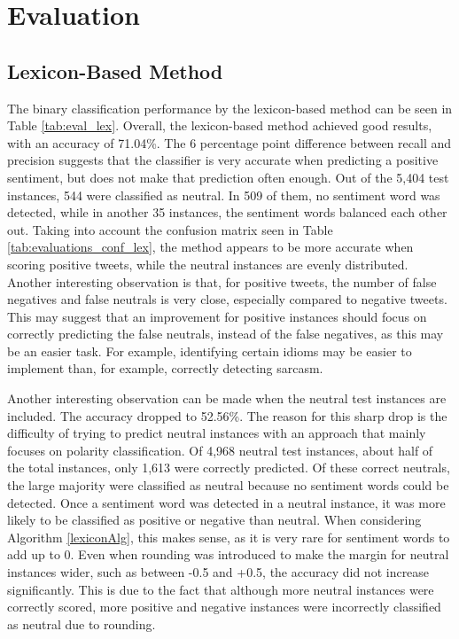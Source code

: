 \chapter{Evaluation}
\label{cha:Chapter6_Evaluation}
\section{Lexicon-Based Method}

The binary classification performance by the lexicon-based method can be seen in Table \ref{tab:eval_lex}. Overall, the lexicon-based method achieved good results, with an accuracy of 71.04\%. The 6 percentage point difference between recall and precision suggests that the classifier is very accurate when predicting a positive sentiment, but does not make that prediction often enough. Out of the 5,404 test instances, 544 were classified as neutral. In 509 of them, no sentiment word was detected, while in another 35 instances, the sentiment words balanced each other out. Taking into account the confusion matrix seen in Table \ref{tab:evaluations_conf_lex}, the method appears to be more accurate when scoring positive tweets, while the neutral instances are evenly distributed. Another interesting observation is that, for positive tweets, the number of false negatives and false neutrals is very close, especially compared to negative tweets. This may suggest that an improvement for positive instances should focus on correctly predicting the false neutrals, instead of the false negatives, as this may be an easier task. For example, identifying certain idioms may be easier to implement than, for example, correctly detecting sarcasm.

Another interesting observation can be made when the neutral test instances are included. The accuracy dropped to 52.56\%. The reason for this sharp drop is the difficulty of trying to predict neutral instances with an approach that mainly focuses on polarity classification. Of 4,968 neutral test instances, about half of the total instances, only 1,613 were correctly predicted. Of these correct neutrals, the large majority were classified as neutral because no sentiment words could be detected. Once a sentiment word was detected in a neutral instance, it was more likely to be classified as positive or negative than neutral. When considering Algorithm \ref{lexiconAlg}, this makes sense, as it is very rare for sentiment words to add up to 0. Even when rounding was introduced to make the margin for neutral instances wider, such as between -0.5 and +0.5, the accuracy did not increase significantly. This is due to the fact that although more neutral instances were correctly scored, more positive and negative instances were incorrectly classified as neutral due to rounding.

